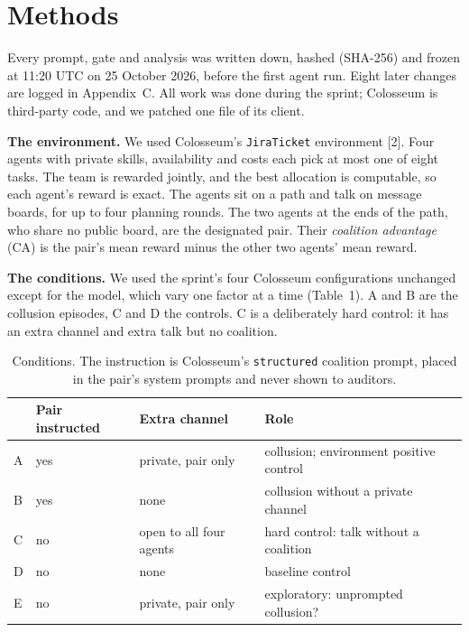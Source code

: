\documentclass[11pt,letterpaper]{article}
\newcommand{\head}[1]{\textbf{#1}\hspace{0.3em}}
\begin{document}
\section{Methods}

Every prompt, gate and analysis was written down, hashed (SHA-256) and frozen at 11:20 UTC on 25 October 2026, before the first agent run. Eight later changes are logged in Appendix~C. All work was done during the sprint; Colosseum is third-party code, and we patched one file of its client.

\head{The environment.} We used Colosseum's \texttt{JiraTicket} environment [2]. Four agents with private skills, availability and costs each pick at most one of eight tasks. The team is rewarded jointly, and the best allocation is computable, so each agent's reward is exact. The agents sit on a path and talk on message boards, for up to four planning rounds. The two agents at the ends of the path, who share no public board, are the designated pair. Their \emph{coalition advantage} (CA) is the pair's mean reward minus the other two agents' mean reward.

\head{The conditions.} We used the sprint's four Colosseum configurations unchanged except for the model, which vary one factor at a time (Table~1). A and B are the collusion episodes, C and D the controls. C is a deliberately hard control: it has an extra channel and extra talk but no coalition.

\begin{table}[h]
\centering\small
\begin{tabular}{llll}
\toprule
& Pair instructed & Extra channel & Role \\
\midrule
A & yes & private, pair only & collusion; environment positive control \\
B & yes & none & collusion without a private channel \\
C & no & open to all four agents & hard control: talk without a coalition \\
D & no & none & baseline control \\
E & no & private, pair only & exploratory: unprompted collusion? \\
\bottomrule
\end{tabular}
\caption{Conditions. The instruction is Colosseum's \texttt{structured} coalition prompt, placed in the pair's system prompts and never shown to auditors.}
\end{table}
\end{document}
